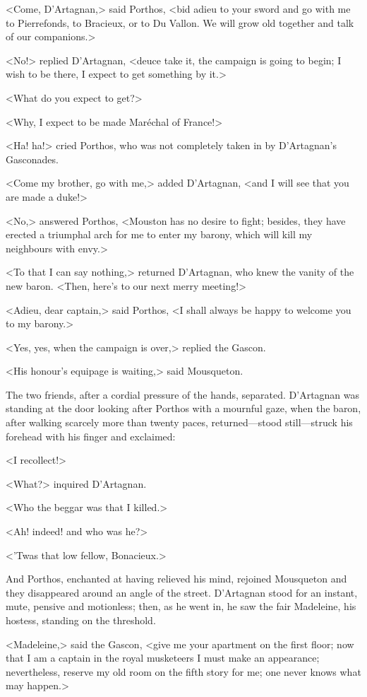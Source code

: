 <Come, D'Artagnan,> said Porthos, <bid adieu to your sword and go with me to Pierrefonds, to Bracieux, or to Du Vallon. We will grow old together and talk of our companions.>

<No!> replied D'Artagnan, <deuce take it, the campaign is going to begin; I wish to be there, I expect to get something by it.>

<What do you expect to get?>

<Why, I expect to be made Maréchal of France!>

<Ha! ha!> cried Porthos, who was not completely taken in by D'Artagnan's Gasconades.

<Come my brother, go with me,> added D'Artagnan, <and I will see that you are made a duke!>

<No,> answered Porthos, <Mouston has no desire to fight; besides, they have erected a triumphal arch for me to enter my barony, which will kill my neighbours with envy.>

<To that I can say nothing,> returned D'Artagnan, who knew the vanity of the new baron. <Then, here's to our next merry meeting!>

<Adieu, dear captain,> said Porthos, <I shall always be happy to welcome you to my barony.>

<Yes, yes, when the campaign is over,> replied the Gascon.

<His honour's equipage is waiting,> said Mousqueton.

The two friends, after a cordial pressure of the hands, separated. D'Artagnan was standing at the door looking after Porthos with a mournful gaze, when the baron, after walking scarcely more than twenty paces, returned—stood still—struck his forehead with his finger and exclaimed:

<I recollect!>

<What?> inquired D'Artagnan.

<Who the beggar was that I killed.>

<Ah! indeed! and who was he?>

<'Twas that low fellow, Bonacieux.>

And Porthos, enchanted at having relieved his mind, rejoined Mousqueton and they disappeared around an angle of the street. D'Artagnan stood for an instant, mute, pensive and motionless; then, as he went in, he saw the fair Madeleine, his hostess, standing on the threshold.

<Madeleine,> said the Gascon, <give me your apartment on the first floor; now that I am a captain in the royal musketeers I must make an appearance; nevertheless, reserve my old room on the fifth story for me; one never knows what may happen.> 